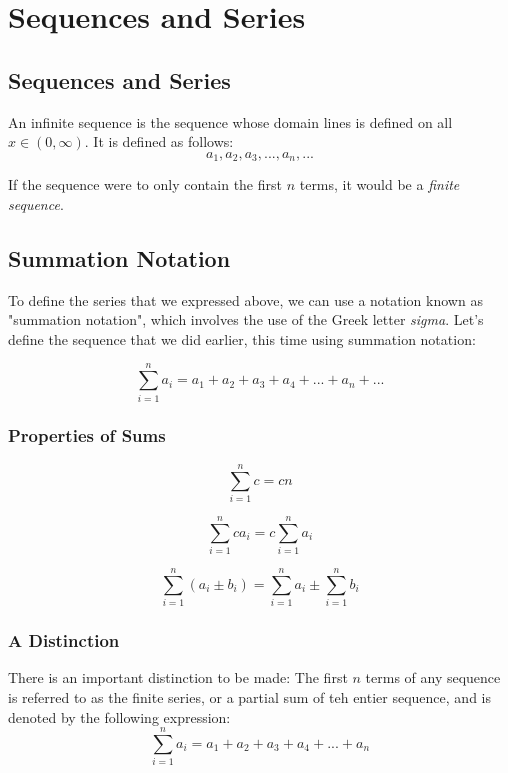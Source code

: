 \chapter{Sequences and Series}
\section{Sequences and Series}
An infinite sequence is the sequence whose domain lines is defined on all
$x\in(0,\infty)$.  It is defined as follows:
\begin{equation}
a_1,a_2,a_3,...,a_n,...
\end{equation}

If the sequence were to only contain the first $n$ terms, it would be a
\textit{finite sequence}.

\section{Summation Notation}
To define the series that we expressed above, we can use a notation known as
"summation notation", which involves the use of the Greek letter
\textit{sigma}.  Let's define the sequence that we did earlier, this time using
summation notation:

\begin{equation}
\sum_{i=1}^na_i=a_1+a_2+a_3+a_4+...+a_n+...
\end{equation}

\subsection{Properties of Sums}
\begin{equation}
\sum_{i=1}^nc=cn
\end{equation}

\begin{equation}
\sum_{i=1}^nca_i=c\sum_{i=1}^{n}a_i
\end{equation}

\begin{equation}
\sum_{i=1}^{n}(a_i \pm b_i)=\sum_{i=1}^{n}a_i\pm\sum_{i=1}^{n}b_i
\end{equation}

\subsection{A Distinction}
There is an important distinction to be made: The first $n$ terms of any
sequence is referred to as the finite series, or a partial sum of teh entier
sequence, and is denoted by the following expression:
\begin{equation}
\sum_{i=1}^{n}a_i=a_1+a_2+a_3+a_4+...+a_n
\end{equation}

